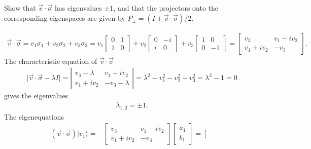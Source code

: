 \documentclass[en]{sol-man}
\begin{document}
\begin{exe}
    Show that $\vec{v}\cdot\vec{\sigma}$ has eigenvalues $\pm 1$, and that the projectors onto the corresponding eigenspaces are given by $P_{\pm}=(I\pm\vec{v}\cdot\vec{\sigma})/2$.
\end{exe}
\begin{pf}
    \begin{align}
        \vec{v}\cdot\vec{\sigma}=v_1\sigma_1+v_2\sigma_2+v_3\sigma_3=v_1\left[\begin{matrix}
            0&1\\
            1&0
        \end{matrix}\right]+v_2\left[\begin{matrix}
            0&-i\\
            i&0
        \end{matrix}\right]+v_3\left[\begin{matrix}
            1&0\\
            0&-1
        \end{matrix}\right]=\left[\begin{matrix}
            v_3&v_1-iv_2\\
            v_1+iv_2&-v_3
        \end{matrix}\right].
    \end{align}
    The characteristic equation of $\vec{v}\cdot\vec{\sigma}$
    \begin{align}
        \lvert\vec{v}\cdot\vec{\sigma}-\lambda I\rvert=\left\lvert\begin{matrix}
            v_3-\lambda&v_1-iv_2\\
            v_1+iv_2&-v_3-\lambda
        \end{matrix}\right\rvert=\lambda^2-v_1^2-v_2^2-v_3^2=\lambda^2-1=0
    \end{align}
    gives the eigenvalues
    \begin{align}
        \lambda_{1,2}=\pm 1.
    \end{align}
    The eigenequations
    \begin{align}
        (\vec{v}\cdot\vec{\sigma})\lvert v_1\rangle=&\left[\begin{matrix}
            v_3&v_1-iv_2\\
            v_1+iv_2&-v_3
        \end{matrix}\right]\left[\begin{matrix}
            a_1\\
            b_1
        \end{matrix}\right]=\left[\begin{matrix}

\end{matrix}
\end{align}
\end{pf}
\end{document}
